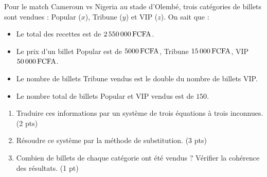 \documentclass[11pt]{article}
\begin{document}
\begin{exercice}
Pour le match Cameroun vs Nigeria au stade d'Olembé, trois catégories de billets sont vendues : Popular ($x$), Tribune ($y$) et VIP ($z$). On sait que :
\begin{itemize}
    \item Le total des recettes est de $\SI{2\,550\,000}{FCFA}$.
    \item Le prix d'un billet Popular est de $\SI{5\,000}{FCFA}$, Tribune $\SI{15\,000}{FCFA}$, VIP $\SI{50\,000}{FCFA}$.
    \item Le nombre de billets Tribune vendus est le double du nombre de billets VIP.
    \item Le nombre total de billets Popular et VIP vendus est de $150$.
\end{itemize}
\begin{enumerate}
    \item Traduire ces informations par un système de trois équations à trois inconnues. (2 pts)
    \item Résoudre ce système par la méthode de substitution. (3 pts)
    \item Combien de billets de chaque catégorie ont été vendus ? Vérifier la cohérence des résultats. (1 pt)
\end{enumerate}
\end{exercice}
\end{document}
